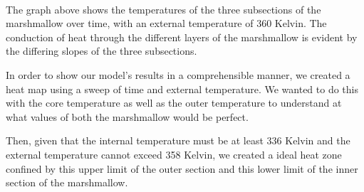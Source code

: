 \documentclass[11pt]{article}
\begin{document}
    \begin{center}
    \end{center}
    { \hspace*{\fill} \\}
    
    The graph above shows the temperatures of the three subsections of the
marshmallow over time, with an external temperature of 360 Kelvin. The
conduction of heat through the different layers of the marshmallow is
evident by the differing slopes of the three subsections.

    In order to show our model's results in a comprehensible manner, we
created a heat map using a sweep of time and external temperature. We
wanted to do this with the core temperature as well as the outer
temperature to understand at what values of both the marshmallow would
be perfect.

Then, given that the internal temperature must be at least 336 Kelvin
and the external temperature cannot exceed 358 Kelvin, we created a
ideal heat zone confined by this upper limit of the outer section and
this lower limit of the inner section of the marshmallow.
\end{document}
